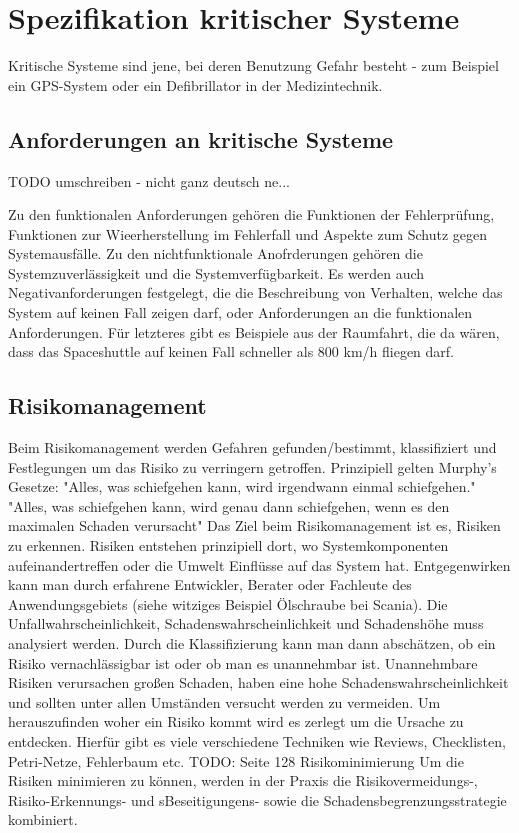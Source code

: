 \section{Spezifikation kritischer Systeme}
Kritische Systeme sind jene, bei deren Benutzung Gefahr besteht - zum Beispiel ein GPS-System oder ein Defibrillator in der Medizintechnik.

\subsection{Anforderungen an kritische Systeme}
TODO umschreiben - nicht ganz deutsch ne...

Zu den funktionalen Anforderungen gehören die Funktionen der Fehlerprüfung, Funktionen zur Wieerherstellung im Fehlerfall und Aspekte zum Schutz gegen Systemausfälle. Zu den nichtfunktionale Anofrderungen gehören die Systemzuverlässigkeit und die Systemverfügbarkeit. Es werden auch Negativanforderungen festgelegt, die die Beschreibung von Verhalten, welche das System auf keinen Fall zeigen darf, oder Anforderungen an die funktionalen Anforderungen. Für letzteres gibt es Beispiele aus der Raumfahrt, die da wären, dass das Spaceshuttle auf keinen Fall schneller als 800 km/h fliegen darf.

\subsection{Risikomanagement}
Beim Risikomanagement werden Gefahren gefunden/bestimmt, klassifiziert und Festlegungen um das Risiko zu verringern getroffen.
\linebreak
Prinzipiell gelten Murphy's Gesetze:
"Alles, was schiefgehen kann, wird irgendwann einmal schiefgehen."
"Alles, was schiefgehen kann, wird genau dann schiefgehen, wenn es den maximalen Schaden verursacht"
\linebreak
Das Ziel beim Risikomanagement ist es, Risiken zu erkennen. Risiken entstehen prinzipiell dort, wo Systemkomponenten aufeinandertreffen oder die Umwelt Einflüsse auf das System hat. Entgegenwirken kann man durch erfahrene Entwickler, Berater oder Fachleute des Anwendungsgebiets (siehe witziges Beispiel Ölschraube bei Scania).
\linebreak
Die Unfallwahrscheinlichkeit, Schadenswahrscheinlichkeit und Schadenshöhe muss analysiert werden. Durch die Klassifizierung kann man dann abschätzen, ob ein Risiko vernachlässigbar ist oder ob man es unannehmbar ist. Unannehmbare Risiken verursachen großen Schaden, haben eine hohe Schadenswahrscheinlichkeit und sollten unter allen Umständen versucht werden zu vermeiden.
\linebreak
Um herauszufinden woher ein Risiko kommt wird es zerlegt um die Ursache zu entdecken. Hierfür gibt es viele verschiedene Techniken wie Reviews, Checklisten, Petri-Netze, Fehlerbaum etc.
\linebreak
TODO: Seite 128 Risikominimierung
Um die Risiken minimieren zu können, werden in der Praxis die Risikovermeidungs-, Risiko-Erkennungs- und sBeseitigungens- sowie die Schadensbegrenzungsstrategie kombiniert.

